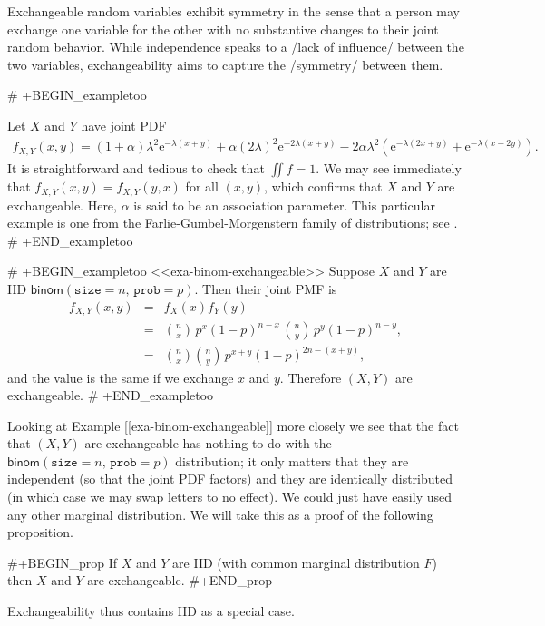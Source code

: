 Exchangeable random variables exhibit symmetry in the sense that a
person may exchange one variable for the other with no substantive
changes to their joint random behavior. While independence speaks to a
/lack of influence/ between the two variables, exchangeability aims to
capture the /symmetry/ between them.

# +BEGIN_exampletoo

Let \(X\) and \(Y\) have joint PDF
\begin{multline}
f_{X,Y}(x,y)=(1+\alpha)\lambda^{2}\mathrm{e}^{-\lambda(x+y)}+\alpha(2\lambda)^{2}\mathrm{e}^{-2\lambda(x+y)}-2\alpha\lambda^{2}\left(\mathrm{e}^{-\lambda(2x+y)}+\mathrm{e}^{-\lambda(x+2y)}\right).
\end{multline}
It is straightforward and tedious to check that \(\iint f=1\). We may
see immediately that \(f_{X,Y}(x,y)=f_{X,Y}(y,x)\) for all \((x,y)\),
which confirms that \(X\) and \(Y\) are exchangeable. Here, \(\alpha\)
is said to be an association parameter. This particular example is one
from the Farlie-Gumbel-Morgenstern family of distributions; see
\cite{Kotz2000}.
# +END_exampletoo


# +BEGIN_exampletoo
<<exa-binom-exchangeable>> Suppose \(X\) and \(Y\) are IID
\(\mathsf{binom}(\mathtt{size}=n,\,\mathtt{prob}=p)\). Then their
joint PMF is
\begin{eqnarray*}
f_{X,Y}(x,y) & = & f_{X}(x)f_{Y}(y)\\
 & = & {n \choose x}\, p^{x}(1-p)^{n-x}\,{n \choose y}\, p^{y}(1-p)^{n-y},\\
 & = & {n \choose x}{n \choose y}\, p^{x+y}(1-p)^{2n-(x+y)},
\end{eqnarray*}
and the value is the same if we exchange \(x\) and \(y\). Therefore
\((X,Y)\) are exchangeable.
# +END_exampletoo


Looking at Example [[exa-binom-exchangeable]] more closely we see that the
fact that \((X,Y)\) are exchangeable has nothing to do with the
\(\mathsf{binom}(\mathtt{size}=n,\,\mathtt{prob}=p)\) distribution; it
only matters that they are independent (so that the joint PDF factors)
and they are identically distributed (in which case we may swap
letters to no effect). We could just have easily used any other
marginal distribution. We will take this as a proof of the following
proposition.

#+BEGIN_prop
If \(X\) and \(Y\) are IID (with common marginal distribution \(F\))
then \(X\) and \(Y\) are exchangeable.
#+END_prop

Exchangeability thus contains IID as a special case. 

